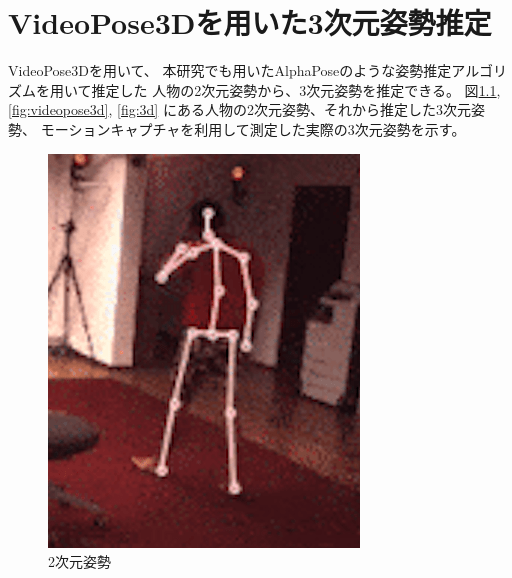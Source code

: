 \documentclass[a4j, fleqn, 12pt]{jsreport}
\begin{document}
\appendix
\chapter{VideoPose3Dを用いた3次元姿勢推定} \label{app:3D}
    VideoPose3Dを用いて、
    本研究でも用いたAlphaPoseのような姿勢推定アルゴリズムを用いて推定した
    人物の2次元姿勢から、3次元姿勢を推定できる。
    図\ref{fig:videopose2d}, \ref{fig:videopose3d}, \ref{fig:3d}
    にある人物の2次元姿勢、それから推定した3次元姿勢、
    モーションキャプチャを利用して測定した実際の3次元姿勢を示す。

    \begin{figure}[ht]
        \begin{minipage}{0.32\hsize}
            \centering
            \includegraphics[width=0.7\hsize]{images/videopose2d.png}
            \caption{2次元姿勢}
            \label{fig:videopose2d}
        \end{minipage}
        \begin{minipage}{0.32\hsize}
            \centering

\end{minipage}
\end{figure}
\end{document}
